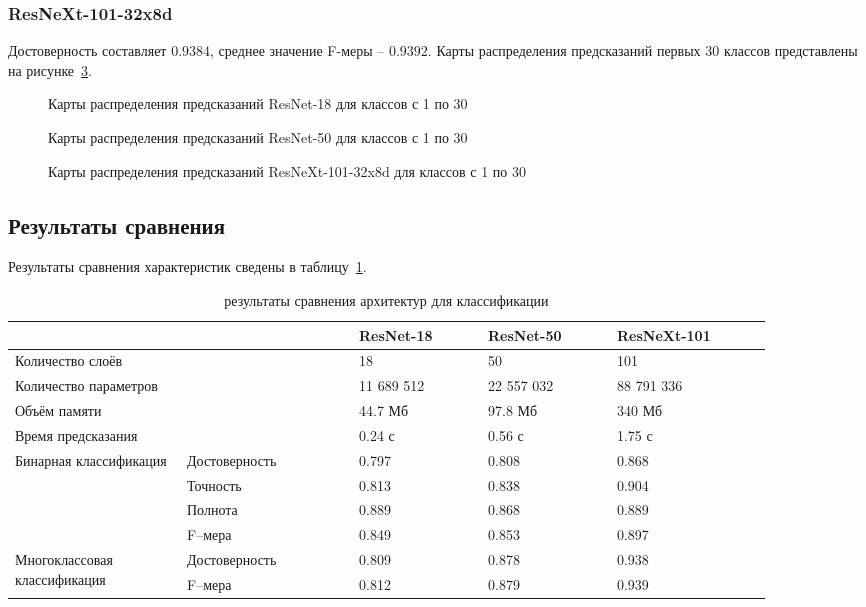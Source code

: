 \subsubsection{ResNeXt-101-32x8d}
Достоверность составляет $0.9384$, среднее значение F-меры -- $0.9392$.
Карты распределения предсказаний первых 30 классов представлены на рисунке~\ref{cd101-maps1}.

\begin{figure}[H]
	\caption{Карты распределения предсказаний ResNet-18 для классов с 1 по 30}
	\label{cd18-maps1}
\end{figure}
\begin{figure}[H]
	\caption{Карты распределения предсказаний ResNet-50 для классов с 1 по 30}
	\label{cd50-maps1}
\end{figure}
\begin{figure}[H]
	\caption{Карты распределения предсказаний ResNeXt-101-32x8d для классов с 1 по 30}
	\label{cd101-maps1}
\end{figure}

\subsection{Результаты сравнения}
Результаты сравнения характеристик сведены в таблицу~\ref{tab:class}.
\begin{table}[H]
	\caption{результаты сравнения архитектур для классификации}
	\label{tab:class}
	\begin{tabular}{|p{0.2\linewidth}|p{0.2\linewidth}|p{0.15\linewidth}|p{0.15\linewidth}|p{0.18\linewidth}|} \hline
\multicolumn{2}{|p{0.4\linewidth}|}{}& ResNet-18 & ResNet-50 & ResNeXt-101 \\ \hline
\multicolumn{2}{|p{0.4\linewidth}|}{Количество слоёв} & 18 & 50 & 101 \\ \hline
\multicolumn{2}{|p{0.4\linewidth}|}{Количество параметров} & 11 689 512 & 22 557 032 & 88 791 336 \\ \hline
\multicolumn{2}{|p{0.4\linewidth}|}{Объём памяти} & 44.7 Мб & 97.8 Мб & 340 Мб \\ \hline
\multicolumn{2}{|p{0.4\linewidth}|}{Время предсказания} & 0.24 с & 0.56 с & 1.75 с \\ \hline
\multirow{4}{0.2\linewidth}{Бинарная классификация} & Достоверность & 0.797 & 0.808 & 0.868 \\
& Точность & 0.813 & 0.838 & 0.904 \\ 
& Полнота & 0.889 & 0.868 & 0.889 \\ 
& F--мера & 0.849 & 0.853 & 0.897 \\ \hline
\multirow{2}{0.2\linewidth}{Многоклассовая классификация} & Достоверность & 0.809 & 0.878 & 0.938 \\
& F--мера & 0.812 & 0.879 & 0.939 \\ \hline
	\end{tabular}
\end{table}

